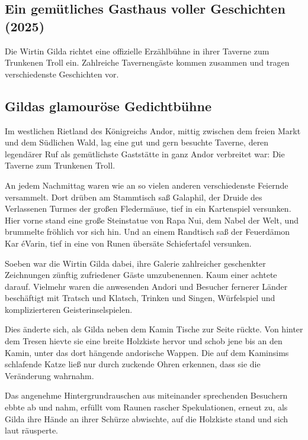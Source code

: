 \begin{chapterbox}
    \chapter{Ein gemütliches Gasthaus voller Geschichten (2025)}
    \label{Ein gemütliches Gasthaus voller Geschichten (2025)}
    
    Die Wirtin Gilda richtet eine offizielle Erzählbühne in ihrer Taverne zum Trunkenen Troll ein. Zahlreiche Tavernengäste kommen zusammen und tragen verschiedenste Geschichten vor.
\end{chapterbox}


\section{Gildas glamouröse Gedichtbühne}

Im westlichen Rietland des Königreichs Andor, mittig zwischen dem freien Markt und dem Südlichen Wald, lag eine gut und gern besuchte Taverne, deren legendärer Ruf als gemütlichste Gaststätte in ganz Andor verbreitet war: Die Taverne zum Trunkenen Troll. 

An jedem Nachmittag waren wie an so vielen anderen verschiedenste Feiernde versammelt. Dort drüben am Stammtisch saß Galaphil, der Druide des Verlassenen Turmes der großen Fledermäuse, tief in ein Kartenspiel versunken. Hier vorne stand eine große Steinstatue von Rapa Nui, dem Nabel der Welt, und brummelte fröhlich vor sich hin. Und an einem Randtisch saß der Feuerdämon Kar éVarin, tief in eine von Runen übersäte Schiefertafel versunken.

Soeben war die Wirtin Gilda dabei, ihre Galerie zahlreicher geschenkter Zeichnungen zünftig zufriedener Gäste umzubenennen. Kaum einer achtete darauf. Vielmehr waren die anwesenden Andori und Besucher fernerer Länder beschäftigt mit Tratsch und Klatsch, Trinken und Singen, Würfelspiel und komplizierteren Geisterinselspielen. 

Dies änderte sich, als Gilda neben dem Kamin Tische zur Seite rückte. Von hinter dem Tresen hievte sie eine breite Holzkiste hervor und schob jene bis an den Kamin, unter das dort hängende andorische Wappen. Die auf dem Kaminsims schlafende Katze ließ nur durch zuckende Ohren erkennen, dass sie die Veränderung wahrnahm.

Das angenehme Hintergrundrauschen aus miteinander sprechenden Besuchern ebbte ab und nahm, erfüllt vom Raunen rascher Spekulationen, erneut zu, als Gilda ihre Hände an ihrer Schürze abwischte, auf die Holzkiste stand und sich laut räusperte.

